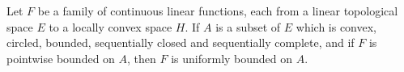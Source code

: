 Let $F$ be a family of continuous linear functions, each from a linear topological space $E$ to a locally convex space $H$. If $A$ is a subset of $E$ which is convex, circled, bounded, sequentially closed and sequentially complete, and if $F$ is pointwise bounded on $A$, then $F$ is uniformly bounded on $A$.
